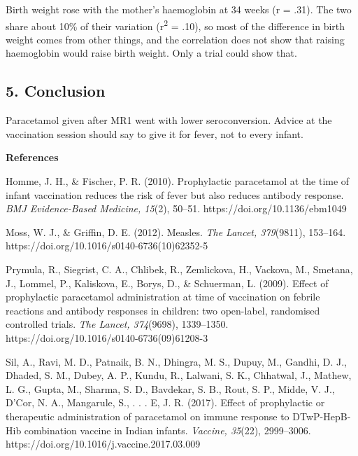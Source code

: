 \documentclass[12pt]{article}
\begin{document}
Birth weight rose with the mother's haemoglobin at 34 weeks (r = .31). The two share about 10\% of their variation (r\textsuperscript{2} = .10), so most of the difference in birth weight comes from other things, and the correlation does not show that raising haemoglobin would raise birth weight. Only a trial could show that.

\subsection{5. Conclusion}

Paracetamol given after MR1 went with lower seroconversion. Advice at the vaccination session should say to give it for fever, not to every infant.

\textbf{References}

Homme, J. H., \& Fischer, P. R. (2010). Prophylactic paracetamol at the time of infant vaccination reduces the risk of fever but also reduces antibody response. \textit{BMJ Evidence-Based Medicine, 15}(2), 50–51. https://doi.org/10.1136/ebm1049

Moss, W. J., \& Griffin, D. E. (2012). Measles. \textit{The Lancet, 379}(9811), 153–164. https://doi.org/10.1016/s0140-6736(10)62352-5

Prymula, R., Siegrist, C. A., Chlibek, R., Zemlickova, H., Vackova, M., Smetana, J., Lommel, P., Kaliskova, E., Borys, D., \& Schuerman, L. (2009). Effect of prophylactic paracetamol administration at time of vaccination on febrile reactions and antibody responses in children: two open-label, randomised controlled trials. \textit{The Lancet, 374}(9698), 1339–1350. https://doi.org/10.1016/s0140-6736(09)61208-3

Sil, A., Ravi, M. D., Patnaik, B. N., Dhingra, M. S., Dupuy, M., Gandhi, D. J., Dhaded, S. M., Dubey, A. P., Kundu, R., Lalwani, S. K., Chhatwal, J., Mathew, L. G., Gupta, M., Sharma, S. D., Bavdekar, S. B., Rout, S. P., Midde, V. J., D’Cor, N. A., Mangarule, S., . . . E, J. R. (2017). Effect of prophylactic or therapeutic administration of paracetamol on immune response to DTwP-HepB-Hib combination vaccine in Indian infants. \textit{Vaccine, 35}(22), 2999–3006. https://doi.org/10.1016/j.vaccine.2017.03.009
\end{document}
